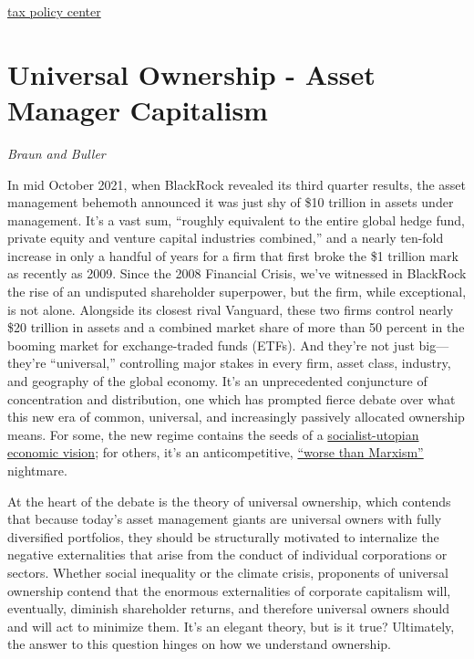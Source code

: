 \documentclass[
]{book}
\begin{document}
\href{https://www.taxpolicycenter.org/taxvox/who-owns-us-stock-foreigners-and-rich-americans}{tax policy center}

\hypertarget{universal-ownership---asset-manager-capitalism}{%
\section{Universal Ownership - Asset Manager Capitalism}\label{universal-ownership---asset-manager-capitalism}}

\emph{Braun and Buller}

In mid October 2021, when BlackRock revealed its third quarter results, the asset management behemoth announced it was just shy of \$10 trillion in assets under management. It's a vast sum, ``roughly equivalent to the entire global hedge fund, private equity and venture capital industries combined,'' and a nearly ten-fold increase in only a handful of years for a firm that first broke the \$1 trillion mark as recently as 2009. Since the 2008 Financial Crisis, we've witnessed in BlackRock the rise of an undisputed shareholder superpower, but the firm, while exceptional, is not alone. Alongside its closest rival Vanguard, these two firms control nearly \$20 trillion in assets and a combined market share of more than 50 percent in the booming market for exchange-traded funds (ETFs). And they're not just big---they're ``universal,'' controlling major stakes in every firm, asset class, industry, and geography of the global economy. It's an unprecedented conjuncture of concentration and distribution, one which has prompted fierce debate over what this new era of common, universal, and increasingly passively allocated ownership means. For some, the new regime contains the seeds of a \href{https://www.peoplespolicyproject.org/2017/08/17/index-funds-are-a-proof-of-concept-for-market-socialism/}{socialist-utopian economic vision}; for others, it's an anticompetitive, \href{https://www.theatlantic.com/ideas/archive/2021/04/the-autopilot-economy/618497/}{``worse than Marxism''} nightmare.

At the heart of the debate is the theory of universal ownership, which contends that because today's asset management giants are universal owners with fully diversified portfolios, they should be structurally motivated to internalize the negative externalities that arise from the conduct of individual corporations or sectors. Whether social inequality or the climate crisis, proponents of universal ownership contend that the enormous externalities of corporate capitalism will, eventually, diminish shareholder returns, and therefore universal owners should and will act to minimize them. It's an elegant theory, but is it true? Ultimately, the answer to this question hinges on how we understand ownership.
\end{document}
